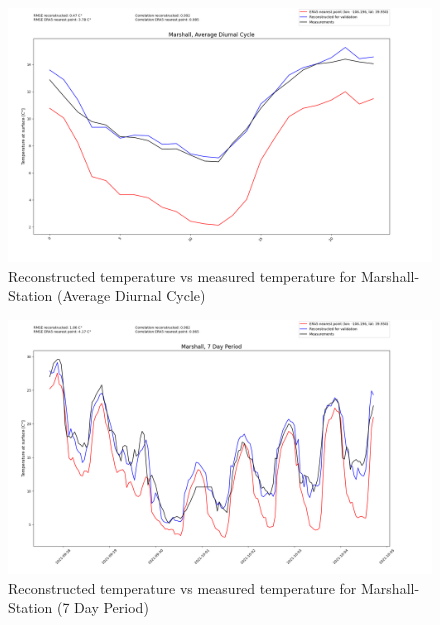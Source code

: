 \begin{figure}
    \centering
    \includegraphics[width=\textwidth]{resources/images/charts/marshall_eval_grib_final/Marshall, Average Diurnal Cycle.png}
    \caption{Reconstructed temperature vs measured temperature for Marshall-Station (Average Diurnal Cycle)}
\end{figure}

\begin{figure}
    \centering
    \includegraphics[width=\textwidth]{resources/images/charts/marshall_eval_grib_final/Marshall, 7 Day Period_1_2_3.png}
    \caption{Reconstructed temperature vs measured temperature for Marshall-Station (7 Day Period)}
\end{figure}


